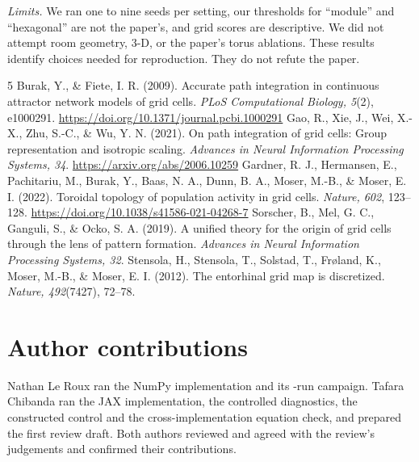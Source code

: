 \documentclass[10pt,letterpaper]{article}
\begin{document}
\emph{Limits.} We ran one to nine seeds per setting, our thresholds for ``module'' and ``hexagonal'' are not the paper's, and grid scores are descriptive. We did not attempt room geometry, 3-D, or the paper's torus ablations. These results identify choices needed for reproduction. They do not refute the paper.

\begin{thebibliography}{5}
Burak, Y., \& Fiete, I. R. (2009).
Accurate path integration in continuous attractor network models of grid cells.
\emph{PLoS Computational Biology, 5}(2), e1000291.
\url{https://doi.org/10.1371/journal.pcbi.1000291}
Gao, R., Xie, J., Wei, X.-X., Zhu, S.-C., \& Wu, Y. N. (2021).
On path integration of grid cells: Group representation and isotropic scaling.
\emph{Advances in Neural Information Processing Systems, 34}.
\url{https://arxiv.org/abs/2006.10259}
Gardner, R. J., Hermansen, E., Pachitariu, M., Burak, Y., Baas, N. A., Dunn, B. A., Moser, M.-B., \& Moser, E. I. (2022).
Toroidal topology of population activity in grid cells.
\emph{Nature, 602}, 123--128.
\url{https://doi.org/10.1038/s41586-021-04268-7}
Sorscher, B., Mel, G. C., Ganguli, S., \& Ocko, S. A. (2019).
A unified theory for the origin of grid cells through the lens of pattern formation.
\emph{Advances in Neural Information Processing Systems, 32}.
Stensola, H., Stensola, T., Solstad, T., Fr{\o}land, K., Moser, M.-B., \& Moser, E. I. (2012).
The entorhinal grid map is discretized.
\emph{Nature, 492}(7427), 72--78.
\end{thebibliography}

\section{Author contributions}
Nathan Le Roux ran the NumPy implementation and its \nJobs-run campaign. Tafara Chibanda ran the JAX implementation, the controlled diagnostics, the constructed control and the cross-implementation equation check, and prepared the first review draft. Both authors reviewed and agreed with the review's judgements and confirmed their contributions.

\clearpage
\onecolumn
\renewcommand{\thetable}{A\arabic{table}}\renewcommand{\thefigure}{A\arabic{figure}}
\setcounter{table}{0}\setcounter{figure}{0}
\end{document}
